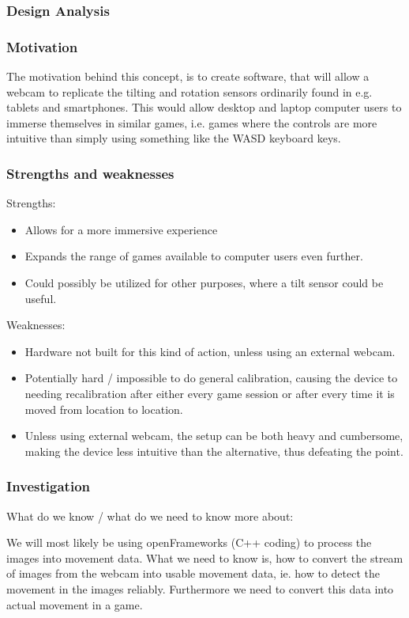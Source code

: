 \subsubsection*{Design Analysis}
\subsubsection*{Motivation}
The motivation behind this concept, is to create software, that will allow a webcam to replicate the tilting and rotation sensors ordinarily found in e.g. tablets and smartphones. This would allow desktop and laptop computer users to immerse themselves in similar games, i.e. games where the controls are more intuitive than simply using something like the WASD keyboard keys.

\subsubsection*{Strengths and weaknesses}
Strengths:
\begin{itemize}
\item Allows for a more immersive experience
\item Expands the range of games available to computer users even further.
\item Could possibly be utilized for other purposes, where a tilt sensor could be useful.
\end{itemize}
Weaknesses:
\begin{itemize}
\item Hardware not built for this kind of action, unless using an external webcam.
\item Potentially hard / impossible to do general calibration, causing the device to needing 	recalibration after either every  game session or after every time it is moved from location to 	location.
\item Unless using external webcam, the setup can be both heavy and cumbersome, making the 	device less intuitive than the alternative, thus defeating the point.
\end{itemize}

\subsubsection*{Investigation}
What do we know / what do we need to know more about:

We will most likely be using openFrameworks (C++ coding) to process the images into movement data. What we need to know is, how to convert the stream of images from the webcam into usable movement data, ie. how to detect the movement in the images reliably. Furthermore we need to convert this data into actual movement in a game.

